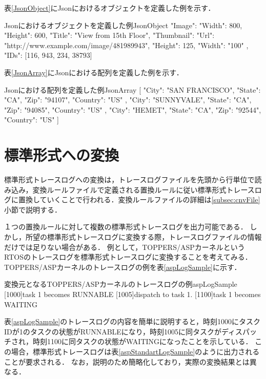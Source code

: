 表\ref{JsonObject}にJsonにおけるオブジェクトを定義した例を示す．

\begin{FileToPage}{Jsonにおけるオブジェクトを定義した例}{JsonObject}
{
  "Image":{
    "Width":  800,
    "Height": 600,
    "Title":  "View from 15th Floor",
    "Thumbnail":{
      "Url":    "http://www.example.com/image/481989943",
      "Height": 125,
      "Width":  "100"
    },
    "IDs": [116, 943, 234, 38793]
  }
}
\end{FileToPage}

表\ref{JsonArray}にJsonにおける配列を定義した例を示す．

\begin{FileToPage}{Jsonにおける配列を定義した例}{JsonArray}
[
  {
    "City":      "SAN FRANCISCO",
    "State":     "CA",
    "Zip":       "94107",
    "Country":   "US"
  },
  {
    "City":      "SUNNYVALE",
    "State":     "CA",
    "Zip":       "94085",
    "Country":   "US"
  },
  {
    "City":      "HEMET",
    "State":     "CA",
    "Zip":       "92544",
    "Country":   "US"
  }
]
\end{FileToPage}

\section{標準形式への変換}

標準形式トレースログへの変換は，トレースログファイルを先頭から行単位で読み込み，変換ルールファイルで定義される置換ルールに従い標準形式トレースログに置換していくことで行われる．変換ルールファイルの詳細は\ref{subsec:cnvFile}小節で説明する．

１つの置換ルールに対して複数の標準形式トレースログを出力可能である．
しかし，所望の標準形式トレースログに変換する際，トレースログファイルの情報だけでは足りない場合がある．
例として，TOPPERS/ASPカーネル\cite{TOPPERS}というRTOSのトレースログを標準形式トレースログに変換することを考えてみる．
TOPPERS/ASPカーネルのトレースログの例を表\ref{aspLogSample}に示す．

\begin{File}{変換元となるTOPPERS/ASPカーネルのトレースログの例}{aspLogSample}
[1000]task 1 becomes RUNNABLE
[1005]dispatch to task 1.
[1100]task 1 becomes WAITING
\end{File}

表\ref{aspLogSample}のトレースログの内容を簡単に説明すると，時刻1000にタスクIDが1のタスクの状態がRUNNABLEになり，時刻1005に同タスクがディスパッチされ，時刻1100に同タスクの状態がWAITINGになったことを示している．
この場合，標準形式トレースログは表\ref{aspStandartLogSample}のように出力されることが要求される．
なお，説明のため簡略化しており，実際の変換結果とは異なる．

